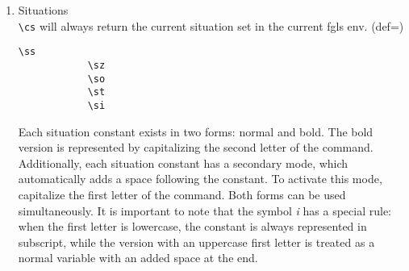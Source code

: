 \documentclass[10pt, a4paper]{article}
\begin{document}
\begin{enumerate}
\begin{center}
\begin{minipage}[h][8cm][t]{15em}
\begin{fgls}
					\bi\\
					\bI\\
					\bs\\
					\bS\\
					\br\\
					\bR\\
					\bp\\
					\bP\\
					\bq\\
					\bQ\\
					\be\\
					\bE
				\end{fgls}
			\end{minipage}
		\end{center}
		\item Situations
		\\\verb=\cs= will always return the current situation set in the current fgls env. (def=\sstar)
		\begin{center}
			\begin{minipage}[h][2.5cm][t]{15em}
				\begin{lstlisting}[style=B]
			\ss
			\sz
			\so
			\st
			\si
				\end{lstlisting}
			\end{minipage}
			\begin{minipage}[h][2.5cm][t]{15em}
				\begin{fgls}
					\ \\
					\ss\\
					\sz\\
					\so\\
					\st\\
					\si
				\end{fgls}
			\end{minipage}
		\end{center}
	Each situation constant exists in two forms: normal and bold. The bold version is represented by capitalizing the second letter of the command. Additionally, each situation constant has a secondary mode, which automatically adds a space following the constant. To activate this mode, capitalize the first letter of the command. Both forms can be used simultaneously. It is important to note that the symbol \textit{i} has a special rule: when the first letter is lowercase, the constant is always represented in subscript, while the version with an uppercase first letter is treated as a normal variable with an added space at the end.
	\end{enumerate}
\end{document}
